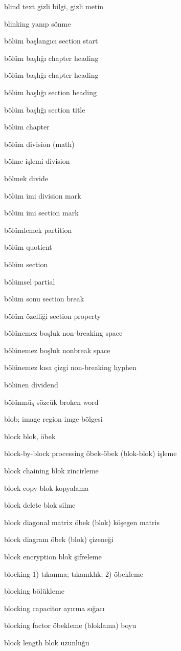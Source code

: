 \documentclass[12pt,fleqn]{article}\usepackage{../../common}
\begin{document}
blind text gizli bilgi, gizli metin

blinking yanıp sönme

bölüm başlangıcı section start

bölüm başlığı chapter heading

bölüm başlığı chapter heading

bölüm başlığı section heading

bölüm başlığı section title

bölüm chapter

bölüm division (math)

bölme işlemi division

bölmek divide

bölüm imi division mark

bölüm imi section mark

bölümlemek partition

bölüm quotient

bölüm section

bölümsel partial

bölüm sonu section break

bölüm özelliği section property

bölünemez boşluk non-breaking space

bölünemez boşluk nonbreak space

bölünemez kısa çizgi non-breaking hyphen

bölünen dividend

bölünmüş sözcük broken word

blob; image region imge bölgesi

block blok, öbek

block-by-block processing öbek-öbek (blok-blok) işleme

block chaining blok zincirleme

block copy blok kopyalama

block delete blok silme

block diagonal matrix öbek (blok) köşegen matris

block diagram öbek (blok) çizeneği

block encryption blok şifreleme

blocking 1) tıkanma; tıkanıklık; 2) öbekleme

blocking bölükleme

blocking capacitor ayırma sığacı

blocking factor öbekleme (bloklama) boyu

block length blok uzunluğu
\end{document}
